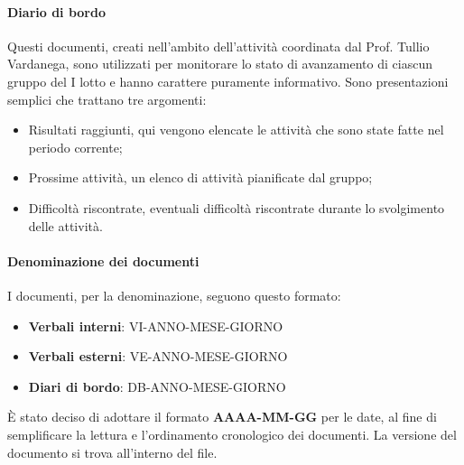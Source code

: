 \documentclass[a4paper,12pt]{article}
\begin{document}
        \paragraph{Diario di bordo}\hfill\break
            Questi documenti, creati nell'ambito dell'attività coordinata dal Prof. Tullio Vardanega, sono utilizzati per monitorare lo stato di avanzamento di ciascun gruppo del I lotto e hanno carattere puramente informativo.
            Sono presentazioni semplici che trattano tre argomenti:
            \begin{itemize}
                \item Risultati raggiunti, qui vengono elencate le attività che sono state fatte nel periodo corrente;
                \item Prossime attività, un elenco di attività pianificate dal gruppo;
                \item Difficoltà riscontrate, eventuali difficoltà riscontrate durante lo svolgimento delle attività.
            \end{itemize}

        \paragraph{Denominazione dei documenti}\hfill\break
            I documenti, per la denominazione, seguono questo formato:
            \begin{itemize}
                \item \textbf{Verbali interni}: VI-ANNO-MESE-GIORNO
                \item \textbf{Verbali esterni}: VE-ANNO-MESE-GIORNO
                \item \textbf{Diari di bordo}: DB-ANNO-MESE-GIORNO
            \end{itemize}
            È stato deciso di adottare il formato \textbf{AAAA-MM-GG} per le date, al fine di semplificare la lettura e l'ordinamento cronologico dei documenti.
            La versione del documento si trova all'interno del file.    
            
    
        
\end{document}
